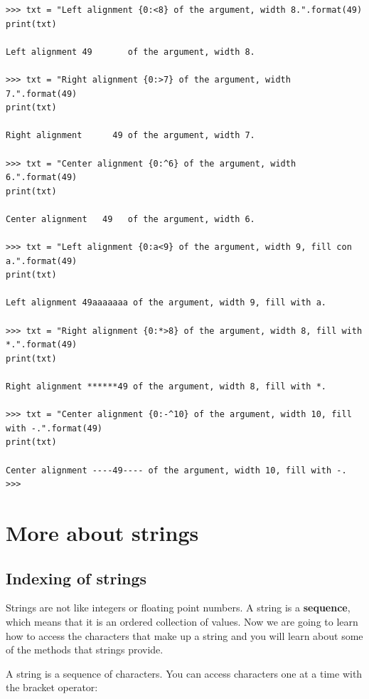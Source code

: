 \begin{small}
\begin{Verbatim}[frame=single]
>>> txt = "Left alignment {0:<8} of the argument, width 8.".format(49)
print(txt)

Left alignment 49       of the argument, width 8.

>>> txt = "Right alignment {0:>7} of the argument, width 7.".format(49)
print(txt)

Right alignment      49 of the argument, width 7.

>>> txt = "Center alignment {0:^6} of the argument, width 6.".format(49)
print(txt)

Center alignment   49   of the argument, width 6.

>>> txt = "Left alignment {0:a<9} of the argument, width 9, fill con a.".format(49)
print(txt)

Left alignment 49aaaaaaa of the argument, width 9, fill with a.

>>> txt = "Right alignment {0:*>8} of the argument, width 8, fill with *.".format(49)
print(txt)

Right alignment ******49 of the argument, width 8, fill with *.

>>> txt = "Center alignment {0:-^10} of the argument, width 10, fill with -.".format(49)
print(txt)

Center alignment ----49---- of the argument, width 10, fill with -.
>>> 
\end{Verbatim}
\end{small}



\section{More about strings}

\subsection{Indexing of strings}

Strings are not like integers or floating point numbers. A string is a \textbf{sequence}, which means that it is an ordered collection of values. Now we are going to learn how to access the characters that make up a string and you will learn about some of the methods that strings provide.

A string is a sequence of characters.
You can access characters one at a time with the bracket operator:

